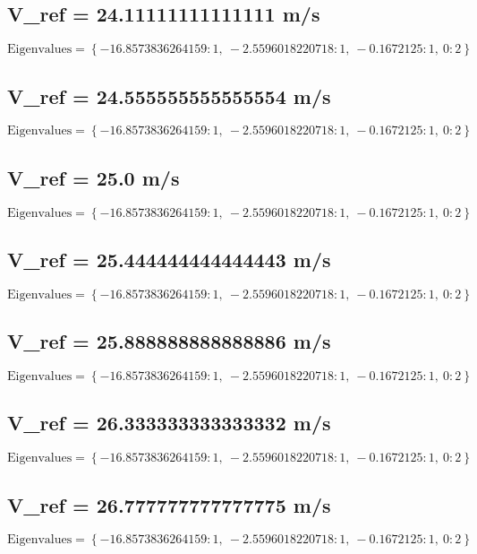 \documentclass{article}
\begin{document}
\subsection*{V_ref = 24.11111111111111 m/s}
\begin{equation}
\text{Eigenvalues} = \left\{ -16.8573836264159 : 1, \  -2.5596018220718 : 1, \  -0.1672125 : 1, \  0 : 2\right\}
\end{equation}
\subsection*{V_ref = 24.555555555555554 m/s}
\begin{equation}
\text{Eigenvalues} = \left\{ -16.8573836264159 : 1, \  -2.5596018220718 : 1, \  -0.1672125 : 1, \  0 : 2\right\}
\end{equation}
\subsection*{V_ref = 25.0 m/s}
\begin{equation}
\text{Eigenvalues} = \left\{ -16.8573836264159 : 1, \  -2.5596018220718 : 1, \  -0.1672125 : 1, \  0 : 2\right\}
\end{equation}
\subsection*{V_ref = 25.444444444444443 m/s}
\begin{equation}
\text{Eigenvalues} = \left\{ -16.8573836264159 : 1, \  -2.5596018220718 : 1, \  -0.1672125 : 1, \  0 : 2\right\}
\end{equation}
\subsection*{V_ref = 25.888888888888886 m/s}
\begin{equation}
\text{Eigenvalues} = \left\{ -16.8573836264159 : 1, \  -2.5596018220718 : 1, \  -0.1672125 : 1, \  0 : 2\right\}
\end{equation}
\subsection*{V_ref = 26.333333333333332 m/s}
\begin{equation}
\text{Eigenvalues} = \left\{ -16.8573836264159 : 1, \  -2.5596018220718 : 1, \  -0.1672125 : 1, \  0 : 2\right\}
\end{equation}
\subsection*{V_ref = 26.777777777777775 m/s}
\begin{equation}
\text{Eigenvalues} = \left\{ -16.8573836264159 : 1, \  -2.5596018220718 : 1, \  -0.1672125 : 1, \  0 : 2\right\}
\end{equation}
\end{document}

